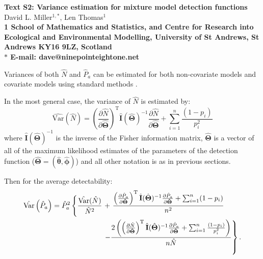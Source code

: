 \documentclass[10pt]{article}
\date{}
\begin{document}
\begin{flushleft}
{\Large
\textbf{Text S2: Variance estimation for mixture model detection functions}
}
\\
David L. Miller$^{1,\ast}$,
Len Thomas$^{1}$
\\
\bf{1} School of Mathematics and Statistics, and Centre for Research into Ecological and Environmental Modelling, University of St Andrews, St Andrews KY16 9LZ, Scotland
\\
$\ast$ E-mail: dave@ninepointeightone.net
\end{flushleft}


Variances of both $\hat{N}$ and $\hat{P}_a$ can be estimated for both non-covariate models and covariate models using standard methods \cite{Borchers:2002vc, Marques:2003vb,Borchers:1998uwa}.

In the most general case, the variance of $\hat{N}$ is estimated by:
\begin{equation*}
\hat{\text{Var}}\left( \hat{N} \right) = \left(\frac{\partial \hat{N}}{\partial\hat{\mathbf{\Theta}}}\right)^\text{T}\hat{\mathbf{I}}(\hat{\mathbf{\Theta}})^{-1}\frac{\partial \hat{N}}{\partial\hat{\mathbf{\Theta}}} + \sum_{i=1}^n \frac{(1-p_i)}{p_i^2}
\end{equation*}
where $\hat{\mathbf{I}}(\hat{\mathbf{\Theta}})^{-1}$ is the inverse of the Fisher information matrix,  $\hat{\mathbf{\Theta}}$ is a vector of all of the maximum likelihood estimates of the parameters of the detection function ($\hat{\mathbf{\Theta}}=(\hat{\mathbf{\theta}},\hat{\mathbf{\phi}})$) and all other notation is as in previous sections.

Then for the average detectability:
\begin{align*}
\hat{\text{Var}}\left( \hat{P}_a \right) = \hat{P}_a^2\left\{ \vphantom{\frac{\frac{a}{b}^b}{b}} \frac{\hat{\text{Var}}(\hat{N})}{\hat{N}^2}\right. &+\left.\frac{\left(\frac{\partial \hat{P}_a}{\partial\mathbf{\hat{\Theta}}}\right)^\text{T}\hat{\mathbf{I}}(\hat{\mathbf{\Theta}})^{-1}\frac{\partial \hat{P}_a}{\partial\mathbf{\hat{\Theta}}}+\sum_{i=1}^n (1-p_i)}{n^2} \right. \\
 & \left. - \frac{2\left(\left(\frac{\partial \hat{N}}{\partial\mathbf{\hat{\Theta}}}\right)^\text{T}\hat{\mathbf{I}}(\hat{\mathbf{\Theta}})^{-1}\frac{\partial \hat{P}_a}{\partial\mathbf{\hat{\Theta}}}+\sum_{i=1}^n\frac{(1-p_i)}{p_i^2}\right)}{n\hat{N}}\right\}.\\
\end{align*}



\end{document}
